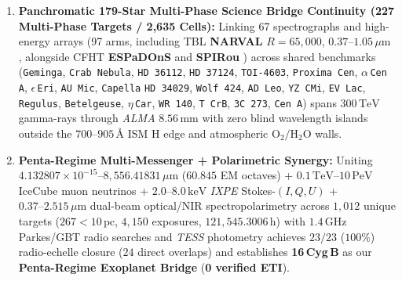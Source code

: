 \documentclass[twocolumn,10pt]{article}
\begin{document}
\begin{enumerate}
  \item \textbf{Panchromatic 179-Star Multi-Phase Science Bridge Continuity (227 Multi-Phase Targets / 2,635 Cells):} Linking 67 spectrographs and high-energy arrays (97 arms, including TBL \textbf{NARVAL} $R=65{,}000$, $0.37\text{--}1.05\,\mu\text{m}$ \cite{Auriere2003,Petit2014}, alongside CFHT \textbf{ESPaDOnS} and \textbf{SPIRou} \cite{Donati1997,Donati2020,Cook2022}) across shared benchmarks (\texttt{Geminga}, \texttt{Crab Nebula}, \texttt{HD\,36112}, \texttt{HD\,37124}, \texttt{TOI-4603}, \texttt{Proxima Cen}, $\alpha$\,\texttt{Cen\,A}, $\epsilon$\,\texttt{Eri}, \texttt{AU\,Mic}, \texttt{Capella} \texttt{HD\,34029}, \texttt{Wolf\,424}, \texttt{AD\,Leo}, \texttt{YZ\,CMi}, \texttt{EV\,Lac}, \texttt{Regulus}, \texttt{Betelgeuse}, $\eta$\,\texttt{Car}, \texttt{WR\,140}, \texttt{T\,CrB}, \texttt{3C\,273}, \texttt{Cen\,A}) spans $300\,\mathrm{TeV}$ gamma-rays through \textit{ALMA} $8.56\,\text{mm}$ with zero blind wavelength islands outside the $700\text{--}905\,\text{\AA}$ ISM H edge and atmospheric $\mathrm{O_2}/\mathrm{H_2O}$ walls.
  \item \textbf{Penta-Regime Multi-Messenger + Polarimetric Synergy:} Uniting $4.132807\times 10^{-15}\text{--}8{,}556.41831\,\mu\text{m}$ ($60.845$ EM octaves) + $0.1\,\mathrm{TeV}\text{--}10\,\mathrm{PeV}$ IceCube muon neutrinos + $2.0\text{--}8.0\,\mathrm{keV}$ \textit{IXPE} Stokes-$(I,Q,U)$ + $0.37\text{--}2.515\,\mu\text{m}$ dual-beam optical/NIR spectropolarimetry across $1{,}012$ unique targets ($267 < 10\,\text{pc}$, $4{,}150$ exposures, $121{,}545.3006\,\text{h}$) with $1.4\,\text{GHz}$ Parkes/GBT radio searches and \textit{TESS} photometry achieves $23/23$ ($100\%$) radio-echelle closure ($24$ direct overlaps) and establishes \textbf{16\,Cyg\,B} as our \textbf{Penta-Regime Exoplanet Bridge} (\textbf{0 verified ETI}).
\end{enumerate}
\end{document}
